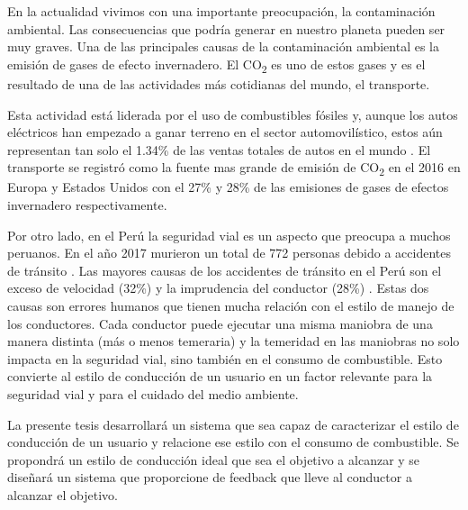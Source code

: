 \begin{introduction}

En la actualidad vivimos con una importante preocupación, la contaminación ambiental. Las consecuencias que podría generar en nuestro planeta pueden ser muy graves. Una de las principales causas de la contaminación ambiental es la emisión de gases de efecto invernadero. El CO\textsubscript{2} es uno de estos gases y es el resultado de una de las actividades más cotidianas del mundo, el transporte.

Esta actividad está liderada por el uso de combustibles fósiles y, aunque los autos eléctricos han empezado a ganar terreno en el sector automovilístico, estos aún representan tan solo el 1.34\% de las ventas totales de autos en el mundo \cite{website:EV-sales}. El transporte se registró como la fuente mas grande de emisión de CO\textsubscript{2} en el 2016 en Europa y Estados Unidos con el 27\% y 28\% de las emisiones de gases de efectos invernadero respectivamente.

Por otro lado, en el Perú la seguridad vial es un aspecto que preocupa a muchos peruanos. En el año 2017 murieron un total de 772 personas debido a accidentes de tránsito \cite{website:El-comercio}. Las mayores causas de los accidentes de tránsito en el Perú son el exceso de velocidad (32\%) y la imprudencia del conductor (28\%) \cite{website:PNP-accidentes}. Estas dos causas son errores humanos que tienen mucha relación con el estilo de manejo de los conductores. Cada conductor puede ejecutar una misma maniobra de una manera distinta (más o menos temeraria) y la temeridad en las maniobras no solo impacta en la seguridad vial, sino también en el consumo de combustible. Esto convierte al estilo de conducción de un usuario en un factor relevante para la seguridad vial y para el cuidado del medio ambiente.

La presente tesis desarrollará un sistema que sea capaz de caracterizar el estilo de conducción de un usuario y  relacione ese estilo con el consumo de combustible. Se propondrá un estilo de conducción ideal que sea el objetivo a alcanzar y se diseñará un sistema que proporcione de feedback que lleve al conductor a alcanzar el objetivo.


\end{introduction}
